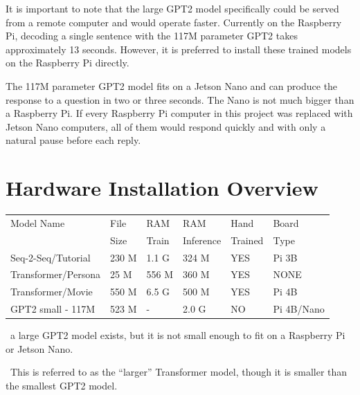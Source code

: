 It is important to note that the large GPT2 model specifically could be served from a remote computer and would operate faster. Currently on the Raspberry Pi, decoding a single sentence with the 117M parameter GPT2 takes approximately 13 seconds. However, it is preferred to install these trained models on the Raspberry Pi directly.

The 117M parameter GPT2 model fits on a Jetson Nano and can produce the response to a question in two or three seconds. The Nano is not much bigger than a Raspberry Pi. If every Raspberry Pi computer in this project was replaced with Jetson Nano computers, all of them would respond quickly and with only a natural pause before each reply.

\section{Hardware Installation Overview}



\begin{table}[H]
	
	\begin{center}
		
		
		\begin{tabular}{llllll}
			
			Model Name    & File  & RAM  & RAM    & Hand & Board \\
			&  Size & Train   & Inference    & Trained &   Type \\
			\hline
			\hline
			Seq-2-Seq/Tutorial & 230 M     & 1.1 G & 324 M             & YES  &  Pi 3B \\
			Transformer/Persona   & 25 M      & 556 M & 360 M          & YES  & NONE \\
			Transformer/Movie \dag \dag  & 550 M      & 6.5 G & 500 M  & YES    & Pi 4B  \\
			GPT2 small - 117M \dag   & 523 M  & -   & 2.0 G         & NO     &  Pi 4B/Nano \\
			\hline
		\end{tabular}
		
		\bigskip
	\end{center}
		\dag \ a large GPT2 model exists, but it is not small enough to fit on a Raspberry Pi or Jetson Nano.
		
		\dag \dag \ This is referred to as the ``larger'' Transformer model, though it is smaller than the smallest GPT2 model.
		
	
	\label{fig:modeloverview}
\end{table}



